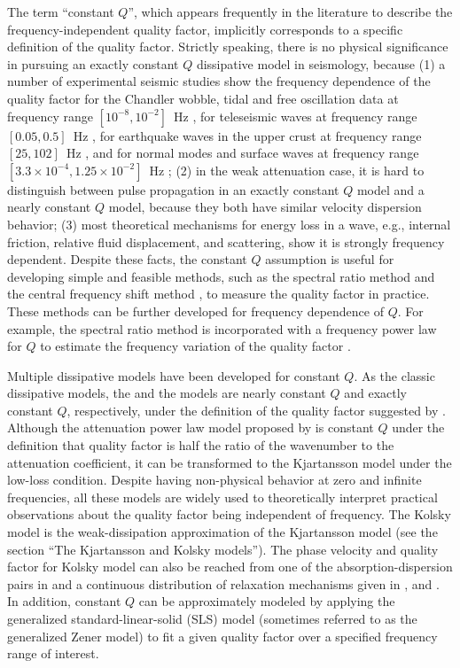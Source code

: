 \documentclass[article]{./macros/elsarticle_qh}
\begin{document}
The term ``constant $Q$'', which appears frequently in the literature to describe the frequency-independent quality factor, implicitly corresponds to a specific definition of the quality factor. Strictly speaking, there is no physical significance in pursuing an exactly constant $Q$ dissipative model in seismology, because (1) a number of experimental seismic studies show the frequency dependence of the quality factor for the Chandler wobble, tidal and free oscillation data at frequency range $[10^{-8}, 10^{-2}]$~Hz \cite[]{anderson:1979}, for teleseismic waves at frequency range $[0.05, 0.5]$~Hz \cite[]{flanagan:1998}, for earthquake waves in the upper crust at frequency range $[25, 102]$~Hz \cite[]{yoshimoto:1998}, and for normal modes and surface waves at frequency range $[3.3\times 10^{-4}, 1.25\times 10^{-2}]$~Hz \cite[]{lekic:2009}; (2) in the weak attenuation case, it is hard to distinguish between pulse  propagation in an exactly constant $Q$ model and a nearly constant $Q$ model, because they both have similar velocity dispersion behavior; (3) most theoretical mechanisms for energy loss in a wave, e.g., internal friction, relative fluid displacement, and scattering, show it is strongly frequency dependent. Despite these facts, the constant $Q$ assumption is useful for developing simple and feasible methods, such as the spectral ratio method \citep[e.g.,][]{tonn:1991} and the central frequency shift method \citep[e.g.,][]{quan:1997}, to measure the quality factor in practice. These methods can be further developed for frequency dependence of $Q$. For example, the spectral ratio method is incorporated with a frequency power law for $Q$ to estimate the frequency variation of the quality factor \citep[e.g.,][]{lekic:2009,beckwith:2017}.

Multiple dissipative models have been developed for constant $Q$. As the classic dissipative models, the \cite{kolsky:1956} and the \cite{kjartansson:1979} models are nearly constant $Q$ and exactly constant $Q$, respectively, under the definition of the quality factor suggested by \cite{connell:1978}. Although the attenuation power law model proposed by \cite{strick:1967} is constant $Q$ under the definition that quality factor is half the ratio of the wavenumber to the attenuation coefficient, it can be transformed to the Kjartansson model under the low-loss condition. 
Despite having non-physical behavior at zero and infinite frequencies, all these models are widely used to theoretically interpret practical observations about the quality factor being independent of frequency. The Kolsky model is the weak-dissipation approximation of the Kjartansson model (see the section ``The Kjartansson and Kolsky models''). The phase velocity and quality factor for Kolsky model can also be reached from one of the absorption-dispersion pairs in \cite{futterman:1962} and a continuous distribution of relaxation mechanisms given in \cite{liu:1976}, \cite{kanamori:1977} and \cite{aki.richards:1980}. In addition, constant $Q$ can be approximately modeled by applying the generalized standard-linear-solid (SLS) model (sometimes referred to as the generalized Zener model) to fit a given quality factor over a specified frequency range of interest. 
\end{document}
